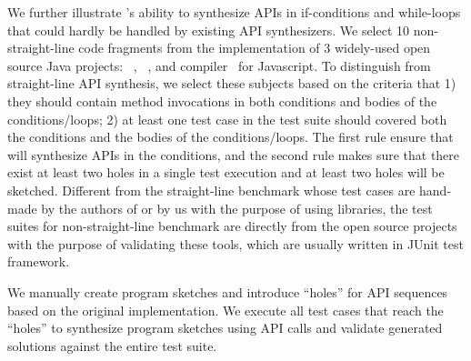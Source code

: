 We further illustrate \tool's ability to synthesize APIs in if-conditions and while-loops that could hardly be  handled by existing API synthesizers.  
We select 10 non-straight-line code fragments from the implementation of 3 widely-used open source Java projects: ~\cite{chart}, ~\cite{math}, and  compiler~\cite{closure} for Javascript.  To distinguish from straight-line API synthesis, we select these subjects based on the criteria that  1) they should contain method invocations in both conditions and bodies of the conditions/loops; 2) at least one test case in the test suite should covered both the conditions and the bodies of the conditions/loops. The first rule ensure that \tool will synthesize APIs in the conditions,  and the second rule makes sure that there exist at least two holes in a single test execution and at least two holes will be sketched. 
Different from the straight-line benchmark whose test cases are hand-made by the authors of \spt or by us with the purpose of using libraries, the test suites for non-straight-line benchmark are directly from the open source projects with the purpose of validating these tools, which are usually written in JUnit test framework. %


We manually create program sketches  and introduce ``holes'' for API sequences based on the original implementation. We execute all test cases that reach the ``holes'' to synthesize program sketches using API calls and   validate generated solutions against the entire test suite. %


